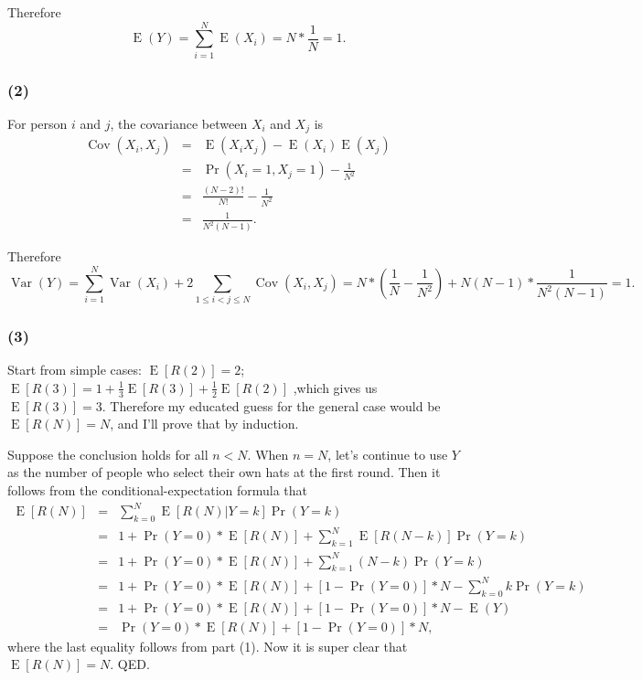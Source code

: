 \documentclass[10pt]{article}
\begin{document}
Therefore 
\begin{equation*}\;\text{E}\;(Y) =\sum _{i =1}^{N}\;\text{E}\;(X_{i}) =N \ast \frac{1}{N} =1.
\end{equation*}

\subsubsection*{(2)}
For person $i$ and $j$, the covariance between $X_{i}$ and $X_{j}$ is
\begin{eqnarray*}\;\text{Cov}\;(X_{i} ,X_{j}) &  = & \;\text{E}\;(X_{i} X_{j}) -\;\text{E}\;(X_{i})\;\text{E}\;(X_{j}) \\
&  = & \;\text{Pr}\;(X_{i} =1 ,X_{j} =1) -\frac{1}{N^{2}} \\
&  = & \frac{(N -2) !}{N !} -\frac{1}{N^{2}} \\
&  = & \frac{1}{N^{2} (N -1)}\text{.}\end{eqnarray*}

Therefore 
\begin{equation*}\;\text{Var}\;(Y) =\sum _{i =1}^{N}\;\text{Var}\;(X_{i}) +2\sum _{1 \leq i <j \leq N}\;\text{Cov}\;(X_{i} ,X_{j}) =N \ast \left (\frac{1}{N} -\frac{1}{N^{2}}\right ) +N (N -1) \ast \frac{1}{N^{2} (N -1)} =1.
\end{equation*}

\subsubsection*{(3)}
Start from simple cases: $\;\text{E}\;[R(2)] =2$; $\;\text{E}\;[R(3)] =1 +\frac{1}{3}\;\text{E}\;[R(3)] +\frac{1}{2}\;\text{E}\;[R(2)]$ ,which gives us $\;\text{E}\;[R(3)] =3$. Therefore my educated guess for the general case would be $\;\text{E}\;[R(N)] =N$, and I'll prove that by induction.

Suppose the conclusion holds for all $n <N$. When $n =N$, let's continue to use $Y$ as the number of people who select their own hats at the first round. Then it follows from the conditional-expectation formula
that
\begin{eqnarray*}\;\text{E}\;[R(N)] &  = & \sum _{k =0}^{N}\;\text{E}\;[R(N)\vert Y =k]\;\text{Pr}\;(Y =k) \\
&  = & 1 +\;\text{Pr}\;(Y =0) \ast \;\text{E}\;[R(N)] +\sum _{k =1}^{N}\;\text{E}\;[R(N -k)]\;\text{Pr}\;(Y =k) \\
&  = & 1 +\;\text{Pr}\;(Y =0) \ast \;\text{E}\;[R(N)] +\sum _{k =1}^{N}(N -k)\;\text{Pr}\;(Y =k) \\
&  = & 1 +\;\text{Pr}\;(Y =0) \ast \;\text{E}\;[R(N)] +[1 -\;\text{Pr}\;(Y =0) ] \ast N -\sum _{k =0}^{N}k\;\text{Pr}\;(Y =k) \\
&  = & 1 +\;\text{Pr}\;(Y =0) \ast \;\text{E}\;[R(N)] +[1 -\;\text{Pr}\;(Y =0) ] \ast N -\;\text{E}\;(Y) \\
&  = & \;\text{Pr}\;(Y =0) \ast \;\text{E}\;[R(N)] +[1 -\;\text{Pr}\;(Y =0) ] \ast N\text{,}\end{eqnarray*}  where the last equality follows from part (1). Now it is super clear that $\;\text{E}\;[R(N)] =N$. QED.
\end{document}
